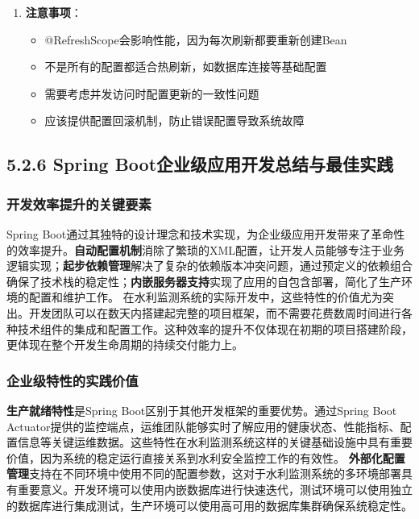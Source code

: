 \begin{enumerate}
\begin{itemize}
支持灰度发布（部分实例先应用新配置） \end{itemize} \item \textbf{注意事项}： \begin{itemize} \tightlist \item
@RefreshScope会影响性能，因为每次刷新都要重新创建Bean \item 不是所有的配置都适合热刷新，如数据库连接等基础配置 \item 需要考虑并发访问时配置更新的一致性问题 \item
应该提供配置回滚机制，防止错误配置导致系统故障 \end{itemize} \end{enumerate} \subsection{5.2.6 Spring
Boot企业级应用开发总结与最佳实践}\label{spring-bootux4f01ux4e1aux7ea7ux5e94ux7528ux5f00ux53d1ux603bux7ed3ux4e0eux6700ux4f73ux5b9eux8df5}
\subsubsection{开发效率提升的关键要素}\label{ux5f00ux53d1ux6548ux7387ux63d0ux5347ux7684ux5173ux952eux8981ux7d20} Spring
Boot通过其独特的设计理念和技术实现，为企业级应用开发带来了革命性的效率提升。\textbf{自动配置机制}消除了繁琐的XML配置，让开发人员能够专注于业务逻辑实现；\textbf{起步依赖管理}解决了复杂的依赖版本冲突问题，通过预定义的依赖组合确保了技术栈的稳定性；\textbf{内嵌服务器支持}实现了应用的自包含部署，简化了生产环境的配置和维护工作。
在水利监测系统的实际开发中，这些特性的价值尤为突出。开发团队可以在数天内搭建起完整的项目框架，而不需要花费数周时间进行各种技术组件的集成和配置工作。这种效率的提升不仅体现在初期的项目搭建阶段，更体现在整个开发生命周期的持续交付能力上。
\subsubsection{企业级特性的实践价值}\label{ux4f01ux4e1aux7ea7ux7279ux6027ux7684ux5b9eux8df5ux4ef7ux503c} \textbf{生产就绪特性}是Spring
Boot区别于其他开发框架的重要优势。通过Spring Boot
Actuator提供的监控端点，运维团队能够实时了解应用的健康状态、性能指标、配置信息等关键运维数据。这些特性在水利监测系统这样的关键基础设施中具有重要价值，因为系统的稳定运行直接关系到水利安全监控工作的有效性。
\textbf{外部化配置管理}支持在不同环境中使用不同的配置参数，这对于水利监测系统的多环境部署具有重要意义。开发环境可以使用内嵌数据库进行快速迭代，测试环境可以使用独立的数据库进行集成测试，生产环境可以使用高可用的数据库集群确保系统稳定性。
